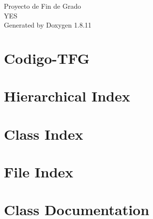\documentclass[twoside]{book}
\newcommand{\+}{\discretionary{\mbox{\scriptsize$\hookleftarrow$}}{}{}}
\newcommand{\clearemptydoublepage}{%
  \newpage{\pagestyle{empty}\cleardoublepage}%
}
\begin{document}
\hypersetup{pageanchor=false,
             bookmarksnumbered=true,
             pdfencoding=unicode
            }
\begin{titlepage}
\vspace*{7cm}
\begin{center}%
{\Large Proyecto de Fin de Grado \\[1ex]\large Y\+ES }\\
\vspace*{1cm}
{\large Generated by Doxygen 1.8.11}\\
\end{center}
\end{titlepage}
\clearemptydoublepage
\tableofcontents
\clearemptydoublepage
{}
\hypersetup{pageanchor=true}

\chapter{Codigo-\/\+T\+FG}
\label{md_README}
\hypertarget{md_README}{}

\chapter{Hierarchical Index}

\chapter{Class Index}

\chapter{File Index}

\chapter{Class Documentation}


















\end{document}
